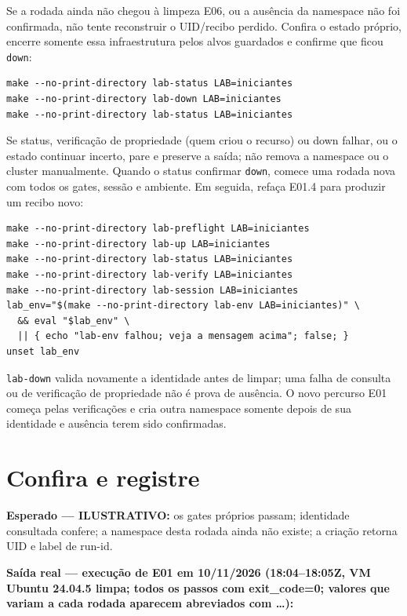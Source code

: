 \documentclass[12pt,openany,oneside,a4paper,chapter=TITLE,english,brazil]{abntex2}
\begin{document}
Se a rodada ainda não chegou à limpeza E06, ou a ausência da namespace não foi
confirmada, não tente reconstruir o UID/recibo perdido. Confira o estado
próprio, encerre somente essa infraestrutura pelos alvos guardados e confirme
que ficou \texttt{down}:

\begin{verbatim}
make --no-print-directory lab-status LAB=iniciantes
make --no-print-directory lab-down LAB=iniciantes
make --no-print-directory lab-status LAB=iniciantes
\end{verbatim}

Se status, verificação de propriedade (quem criou o recurso) ou down falhar, ou o estado continuar incerto, pare e
preserve a saída; não remova a namespace ou o cluster manualmente. Quando o
status confirmar \texttt{down}, comece uma rodada nova com todos os gates, sessão e
ambiente. Em seguida, refaça E01.4 para produzir um recibo novo:

\begin{verbatim}
make --no-print-directory lab-preflight LAB=iniciantes
make --no-print-directory lab-up LAB=iniciantes
make --no-print-directory lab-status LAB=iniciantes
make --no-print-directory lab-verify LAB=iniciantes
make --no-print-directory lab-session LAB=iniciantes
lab_env="$(make --no-print-directory lab-env LAB=iniciantes)" \
  && eval "$lab_env" \
  || { echo "lab-env falhou; veja a mensagem acima"; false; }
unset lab_env
\end{verbatim}

\texttt{lab-{}\allowbreak{}down} valida novamente a identidade antes de limpar; uma falha de consulta
ou de verificação de propriedade não é prova de ausência. O novo percurso E01 começa pelas
verificações e cria outra namespace somente depois de sua identidade e
ausência terem sido confirmadas.

\section*{Confira e registre}\label{confira-e-registre}

\textbf{Esperado --- ILUSTRATIVO:} os gates próprios passam; identidade consultada confere; a namespace desta rodada ainda não existe; a criação retorna UID e label de run-id.

\clearpage

\textbf{Saída real --- execução de E01 em 10/11/2026 (18:04--18:05Z, VM Ubuntu 24.04.5 limpa; todos os passos com exit\_code=0; valores que variam a cada rodada aparecem abreviados com \ldots):}
\end{document}
